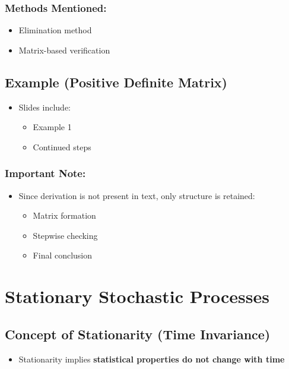 \documentclass[12pt]{article}
\begin{document}
\subsubsection*{Methods Mentioned:}

\begin{itemize}
    \item Elimination method
    \item Matrix-based verification
\end{itemize}

\subsection{Example (Positive Definite Matrix)}

\begin{itemize}
    \item Slides include:
    \begin{itemize}
        \item Example 1
        \item Continued steps
    \end{itemize}
\end{itemize}

\subsubsection*{Important Note:}

\begin{itemize}
    \item Since derivation is not present in text, only structure is retained:
    \begin{itemize}
        \item Matrix formation
        \item Stepwise checking
        \item Final conclusion
    \end{itemize}
\end{itemize}

\section{Stationary Stochastic Processes}

\subsection{Concept of Stationarity (Time Invariance)}

\begin{itemize}
    \item Stationarity implies \textbf{statistical properties do not change with time}
\end{itemize}
\end{document}
